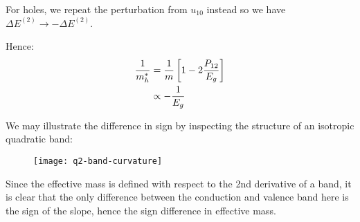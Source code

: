 \begin{parts}
	For holes, we repeat the perturbation from $u_{10}$ instead so we have $\Delta E^{(2)} \rightarrow -\Delta E^{(2)}$.
	
	Hence:
	\begin{align*}
		\frac{1}{m_h^*} &= \frac{1}{m} \left[1 - 2\frac{P_{12}}{E_g}\right] \\
		&\propto -\frac{1}{E_g}
	\end{align*}
	
	We may illustrate the difference in sign by inspecting the structure of an isotropic quadratic band:
	\begin{figure}[H]
		\centering
		\texttt{[image: q2-band-curvature]}
	\end{figure}
	Since the effective mass is defined with respect to the 2nd derivative of a band, it is clear that the only difference between the conduction and valence band here is the sign of the slope, hence the sign difference in effective mass.
\end{parts}
